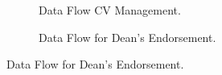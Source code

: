 \documentclass[12pt]{article}
\begin{document}
\begin{figure}
\begin{subfigure}[p]{0.47\textwidth}
\centering	
{}
\caption{Data Flow CV Management.}
\end{subfigure}

\begin{subfigure}[p]{0.47\textwidth}
\centering	
{}
\caption{Data Flow for Dean's Endorsement.}
\end{subfigure}


\end{figure}
\end{document}

